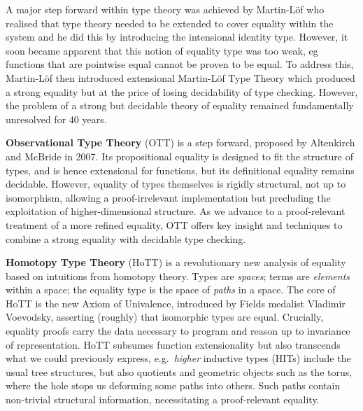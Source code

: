 \documentclass[a4paper,11pt]{article}
\begin{document}
A major step forward within type theory was achieved by Martin-L\"of
who realised that type theory needed to be extended to cover equality
within the system and he did this by introducing the intensional identity type.
However, it soon became apparent that this notion of equality type was
too weak, eg functions that are pointwise equal cannot be proven to
be equal. To address this, Martin-L\"of then introduced extensional
Martin-L\"of Type Theory which produced a strong equality but at the price of
losing decidability of type checking. However, the problem of a strong but
decidable theory of equality remained fundamentally unresolved for 40
years. 

{\bf Observational Type Theory} (OTT) is a step forward, proposed by
Altenkirch and McBride in 2007. Its propositional equality is designed
to fit the structure of types, and is hence extensional for functions,
but its definitional equality remains decidable. However, equality of
types themselves is rigidly structural, not up to isomorphism,
allowing a proof-irrelevant implementation but precluding the
exploitation of higher-dimensional structure. As we advance to a
proof-relevant treatment of a more refined equality, OTT offers key
insight and techniques to combine a strong equality with decidable
type checking.





{\bf Homotopy Type Theory} (HoTT) is a revolutionary new analysis of
equality based on intuitions from homotopy theory. Types are \emph{spaces};
terms are \emph{elements} within a space; the equality type is the space of
\emph{paths} in a space. The core of HoTT is the new Axiom of Univalence,
introduced by Fields medalist Vladimir Voevodsky, asserting (roughly)
that isomorphic types are equal. Crucially, equality proofs carry
the data necessary to program and reason up to invariance of
representation. HoTT subsumes function extensionality but also
transcends what we could previously express, e.g.\ \emph{higher}
inductive types (HITs) include the usual tree structures, but
also quotients and geometric objects such as the torus, where the hole
stops us deforming some paths into others. Such paths contain
non-trivial structural information, necessitating a proof-relevant equality.
\end{document}
